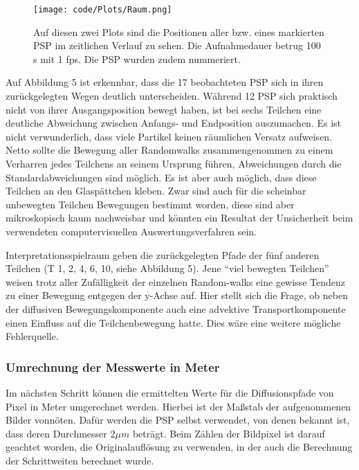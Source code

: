 \documentclass[class=article, crop=false]{standalone}
\begin{document}
\begin{figure}
\centering
\texttt{[image: code/Plots/Raum.png]}
\caption{Auf diesen zwei Plots sind die Positionen aller bzw. eines
markierten PSP im zeitlichen Verlauf zu sehen. Die Aufnahmedauer betrug
100 s mit 1 fps. Die PSP wurden zudem nummeriert.}
\end{figure}

Auf Abbildung 5 ist erkennbar, dass die 17 beobachteten PSP sich in
ihren zurückgelegten Wegen deutlich unterscheiden. Während 12 PSP sich
praktisch nicht von ihrer Ausgangsposition bewegt haben, ist bei sechs
Teilchen eine deutliche Abweichung zwischen Anfangs- und Endposition
auszumachen. Es ist nicht verwunderlich, dass viele Partikel keinen
räumlichen Versatz aufweisen. Netto sollte die Bewegung aller
Randomwalks zusammengenommen zu einem Verharren jedes Teilchens an
seinem Ursprung führen, Abweichungen durch die Standardabweichungen sind
möglich. Es ist aber auch möglich, dass diese Teilchen an den
Glaspättchen kleben. Zwar sind auch für die scheinbar unbewegten
Teilchen Bewegungen bestimmt worden, diese sind aber mikroskopisch kaum
nachweisbar und könnten ein Resultat der Unsicherheit beim verwendeten
computervisuellen Auswertungsverfahren sein.

Interpretationsspielraum geben die zurückgelegten Pfade der fünf anderen
Teilchen (T 1, 2, 4, 6, 10, siehe Abbildung 5). Jene ``viel bewegten
Teilchen'' weisen trotz aller Zufälligkeit der einzelnen Random-walks
eine gewisse Tendenz zu einer Bewegung entgegen der y-Achse auf. Hier
stellt sich die Frage, ob neben der diffusiven Bewegungskomponente auch
eine advektive Transportkomponente einen Einfluss auf die
Teilchenbewegung hatte. Dies wäre eine weitere mögliche Fehlerquelle.

\hypertarget{umrechnung-der-messwerte-in-meter}{%
\subsubsection{Umrechnung der Messwerte in
Meter}\label{umrechnung-der-messwerte-in-meter}}

Im nächsten Schritt können die ermittelten Werte für die Diffusionspfade
von Pixel in Meter umgerechnet werden. Hierbei ist der Maßstab der
aufgenommenen Bilder vonnöten. Dafür werden die PSP selbst verwendet,
von denen bekannt ist, dass deren Durchmesser \(2 \mu m\) beträgt. Beim
Zählen der Bildpixel ist darauf geachtet worden, die Originalauflösung
zu verwenden, in der auch die Berechnung der Schrittweiten berechnet
wurde.
\end{document}
